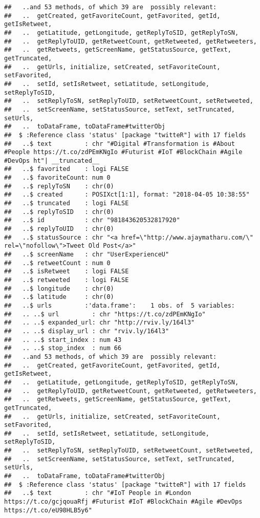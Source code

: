\documentclass[]{article}
\begin{document}
\begin{verbatim}
##   ..and 53 methods, of which 39 are  possibly relevant:
##   ..  getCreated, getFavoriteCount, getFavorited, getId, getIsRetweet,
##   ..  getLatitude, getLongitude, getReplyToSID, getReplyToSN,
##   ..  getReplyToUID, getRetweetCount, getRetweeted, getRetweeters,
##   ..  getRetweets, getScreenName, getStatusSource, getText, getTruncated,
##   ..  getUrls, initialize, setCreated, setFavoriteCount, setFavorited,
##   ..  setId, setIsRetweet, setLatitude, setLongitude, setReplyToSID,
##   ..  setReplyToSN, setReplyToUID, setRetweetCount, setRetweeted,
##   ..  setScreenName, setStatusSource, setText, setTruncated, setUrls,
##   ..  toDataFrame, toDataFrame#twitterObj
##  $ :Reference class 'status' [package "twitteR"] with 17 fields
##   ..$ text         : chr "#Digital #Transformation is #About #People https://t.co/zdPEmKNgIo #Futurist #IoT #BlockChain #Agile #DevOps ht"| __truncated__
##   ..$ favorited    : logi FALSE
##   ..$ favoriteCount: num 0
##   ..$ replyToSN    : chr(0) 
##   ..$ created      : POSIXct[1:1], format: "2018-04-05 10:38:55"
##   ..$ truncated    : logi FALSE
##   ..$ replyToSID   : chr(0) 
##   ..$ id           : chr "981843620532817920"
##   ..$ replyToUID   : chr(0) 
##   ..$ statusSource : chr "<a href=\"http://www.ajaymatharu.com/\" rel=\"nofollow\">Tweet Old Post</a>"
##   ..$ screenName   : chr "UserExperienceU"
##   ..$ retweetCount : num 0
##   ..$ isRetweet    : logi FALSE
##   ..$ retweeted    : logi FALSE
##   ..$ longitude    : chr(0) 
##   ..$ latitude     : chr(0) 
##   ..$ urls         :'data.frame':    1 obs. of  5 variables:
##   .. ..$ url         : chr "https://t.co/zdPEmKNgIo"
##   .. ..$ expanded_url: chr "http://rviv.ly/164l3"
##   .. ..$ display_url : chr "rviv.ly/164l3"
##   .. ..$ start_index : num 43
##   .. ..$ stop_index  : num 66
##   ..and 53 methods, of which 39 are  possibly relevant:
##   ..  getCreated, getFavoriteCount, getFavorited, getId, getIsRetweet,
##   ..  getLatitude, getLongitude, getReplyToSID, getReplyToSN,
##   ..  getReplyToUID, getRetweetCount, getRetweeted, getRetweeters,
##   ..  getRetweets, getScreenName, getStatusSource, getText, getTruncated,
##   ..  getUrls, initialize, setCreated, setFavoriteCount, setFavorited,
##   ..  setId, setIsRetweet, setLatitude, setLongitude, setReplyToSID,
##   ..  setReplyToSN, setReplyToUID, setRetweetCount, setRetweeted,
##   ..  setScreenName, setStatusSource, setText, setTruncated, setUrls,
##   ..  toDataFrame, toDataFrame#twitterObj
##  $ :Reference class 'status' [package "twitteR"] with 17 fields
##   ..$ text         : chr "#IoT People in #London https://t.co/gcjqouaRfj #Futurist #IoT #BlockChain #Agile #DevOps https://t.co/eU98HLB5y6"

\end{verbatim}
\end{document}
